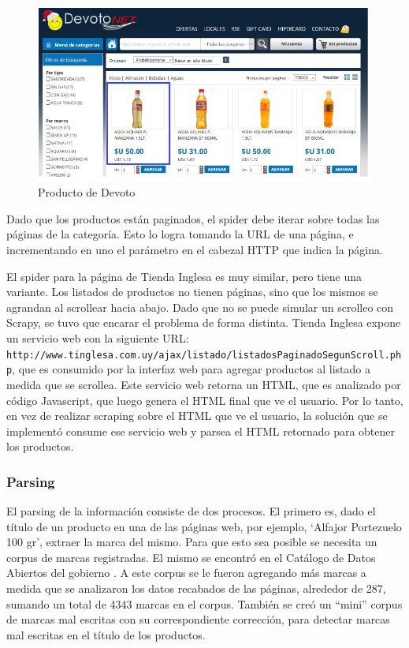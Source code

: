 \documentclass[12pt]{article} %
\begin{document}
\begin{figure}[H]
\includegraphics[height=0.30\textwidth]{producto_devoto}
\centering
\caption{Producto de Devoto}
\end{figure}


Dado que los productos están paginados, el spider debe iterar sobre todas las páginas de la categoría. Esto lo logra tomando la URL de una página, e incrementando en uno el parámetro en el cabezal HTTP que indica la página.

El spider para la página de Tienda Inglesa \cite{TInglesa} es muy similar, pero tiene una variante. Los listados de productos no tienen páginas, sino que los mismos se agrandan al scrollear hacia abajo. Dado que no se puede simular un scrolleo con Scrapy, se tuvo que encarar el problema de forma distinta. Tienda Inglesa expone un servicio web con la siguiente URL: \texttt{http://www.tinglesa.com.uy/ajax/listado/listadosPaginadoSegunScroll.php}, que es consumido por la interfaz web para agregar productos al listado a medida que se scrollea. Este servicio web retorna un HTML, que es analizado por código Javascript, que luego genera el HTML final que ve el usuario. Por lo tanto, en vez de realizar scraping sobre el HTML que ve el usuario, la solución que se implementó consume ese servicio web y parsea el HTML retornado para obtener los productos.

\subsubsection{Parsing}

El parsing de la información consiste de dos procesos. El primero es, dado el título de un producto en una de las páginas web, por ejemplo, ‘Alfajor Portezuelo 100 gr’, extraer la marca del mismo. Para que esto sea posible se necesita un corpus de marcas registradas. El mismo se encontró en el Catálogo de Datos Abiertos del gobierno \cite{DatosAbiertos}. A este corpus se le fueron agregando más marcas a medida que se analizaron los datos recabados de las páginas, alrededor de 287, sumando un total de 4343 marcas en el corpus. También se creó un “mini” corpus de marcas mal escritas con su correspondiente corrección, para detectar marcas mal escritas en el título de los productos.
\end{document}
